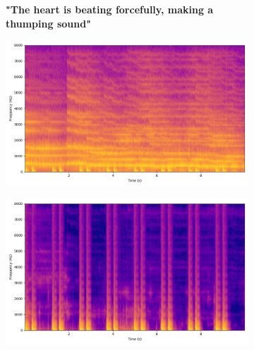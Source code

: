 \begin{figure}[htbp]
    \centering
    \begin{subfigure}[b]{0.185\textwidth}
        \centering
        \scriptsize\textbf{"The heart is beating forcefully, making a thumping sound"}
        \vspace{5.0mm}
    \end{subfigure}
    \begin{subfigure}[b]{0.185\textwidth}
        \centering
        \includegraphics[width=\textwidth]{plots/onepeace_best_sdr/onepeace mixture_spectrogram.png}
    \end{subfigure}
    \begin{subfigure}[b]{0.185\textwidth}
        \centering
        \includegraphics[width=\textwidth]{plots/onepeace_best_sdr/onepeace sep_spectrogram.png}
    \end{subfigure}
    \begin{subfigure}[b]{0.185\textwidth}
        \centering

\end{subfigure}
\end{figure}
